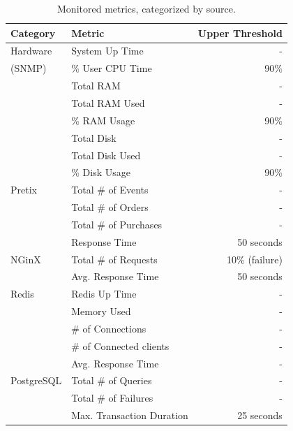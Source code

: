 \documentclass[12pt]{article}
\begin{document}
\begin{table}[H]
  \begin{center}
    \begin{tabular}{l|l|r}
      \hline
      \textbf{Category}   & \textbf{Metric}           & \textbf{Upper Threshold}  \\
      \hline 
      Hardware            & System Up Time            & -                         \\
      (SNMP)              & \% User CPU Time          & 90\%                      \\
                          & Total RAM                 & -                         \\
                          & Total RAM Used            & -                         \\
                          & \% RAM Usage              & 90\%                      \\
                          & Total Disk                & -                         \\
                          & Total Disk Used           & -                         \\
                          & \% Disk Usage             & 90\%                      \\
      \hline
      Pretix              & Total \# of Events        & -                         \\
                          & Total \# of Orders        & -                         \\
                          & Total \# of Purchases     & -                         \\
                          & Response Time             & 50 seconds                \\
      \hline
      NGinX               & Total \# of Requests      & 10\% (failure)            \\
                          & Avg. Response Time        & 50 seconds                \\
      \hline
      Redis               & Redis Up Time             & -                         \\
                          & Memory Used               & -                         \\
                          & \# of Connections         & -                         \\
                          & \# of Connected clients   & -                         \\
                          & Avg. Response Time        & -                         \\
      \hline
      PostgreSQL          & Total \# of Queries       & -                         \\
                          & Total \# of Failures      & -                         \\
                          & Max. Transaction Duration & 25 seconds                \\
      \hline
    \end{tabular}
    \caption{Monitored metrics, categorized by source.}
    \label{tab:sla}
  \end{center}
\end{table}
\end{document}
